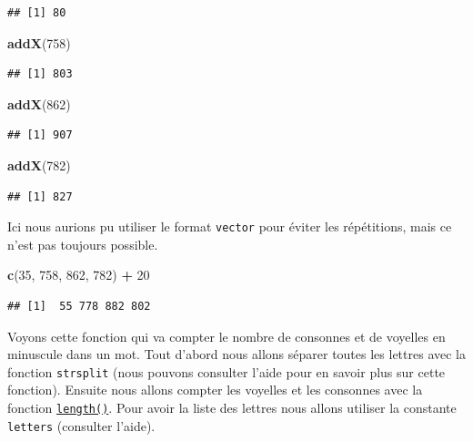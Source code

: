 \documentclass[
]{book}
\newenvironment{Shaded}{\begin{snugshade}}{\end{snugshade}}
\newcommand{\DecValTok}[1]{\textcolor[rgb]{0.00,0.00,0.81}{#1}}
\newcommand{\KeywordTok}[1]{\textcolor[rgb]{0.13,0.29,0.53}{\textbf{#1}}}
\newcommand{\NormalTok}[1]{#1}
\newcommand{\OperatorTok}[1]{\textcolor[rgb]{0.81,0.36,0.00}{\textbf{#1}}}
\newcommand{\StringTok}[1]{\textcolor[rgb]{0.31,0.60,0.02}{#1}}
\begin{document}
\begin{verbatim}
## [1] 80
\end{verbatim}

\begin{Shaded}
\begin{Highlighting}[]
\KeywordTok{addX}\NormalTok{(}\DecValTok{758}\NormalTok{)}
\end{Highlighting}
\end{Shaded}

\begin{verbatim}
## [1] 803
\end{verbatim}

\begin{Shaded}
\begin{Highlighting}[]
\KeywordTok{addX}\NormalTok{(}\DecValTok{862}\NormalTok{)}
\end{Highlighting}
\end{Shaded}

\begin{verbatim}
## [1] 907
\end{verbatim}

\begin{Shaded}
\begin{Highlighting}[]
\KeywordTok{addX}\NormalTok{(}\DecValTok{782}\NormalTok{)}
\end{Highlighting}
\end{Shaded}

\begin{verbatim}
## [1] 827
\end{verbatim}

Ici nous aurions pu utiliser le format \texttt{vector} pour éviter les répétitions, mais ce n'est pas toujours possible.

\begin{Shaded}
\begin{Highlighting}[]
\KeywordTok{c}\NormalTok{(}\DecValTok{35}\NormalTok{, }\DecValTok{758}\NormalTok{, }\DecValTok{862}\NormalTok{, }\DecValTok{782}\NormalTok{) }\OperatorTok{+}\StringTok{ }\DecValTok{20}
\end{Highlighting}
\end{Shaded}

\begin{verbatim}
## [1]  55 778 882 802
\end{verbatim}

Voyons cette fonction qui va compter le nombre de consonnes et de voyelles en minuscule dans un mot. Tout d'abord nous allons séparer toutes les lettres avec la fonction \texttt{strsplit} (nous pouvons consulter l'aide pour en savoir plus sur cette fonction). Ensuite nous allons compter les voyelles et les consonnes avec la fonction \protect\hyperlink{l015length}{\texttt{length()}}. Pour avoir la liste des lettres nous allons utiliser la constante \texttt{letters} (consulter l'aide).
\end{document}
